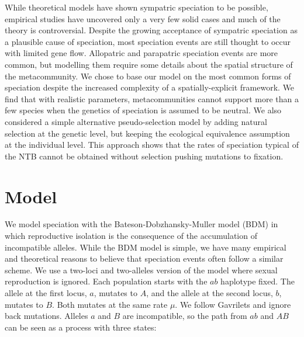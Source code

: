 \documentclass[letterpaper,twocolumn,showkeys]{revtex4-1}
\begin{document}
While theoretical models have shown sympatric speciation to be possible,
empirical studies have uncovered only a very few solid cases and much of the
theory is controversial. Despite the growing acceptance of sympatric
speciation as a plausible cause of speciation, most speciation events are
still thought to occur with limited gene flow. Allopatric and parapatric
speciation events are more common, but modelling them require some details
about the spatial structure of the metacommunity. We chose to base our model
on the most common forms of speciation despite the increased complexity of a
spatially-explicit framework. We find that with realistic parameters,
metacommunities cannot support more than a few species when the genetics of
speciation is assumed to be neutral. We also considered a simple alternative
pseudo-selection model by adding natural selection at the genetic level, but
keeping the ecological equivalence assumption at the individual level. This
approach shows that the rates of speciation typical of the NTB cannot be
obtained without selection pushing mutations to fixation.

\section{Model}

We model speciation with the Bateson-Dob\-zhan\-sky-Muller model (BDM) in
which reproductive isolation is the consequence of the accumulation of
incompatible alleles. While the BDM model is simple, we have many empirical
and theoretical reasons to believe that speciation events often follow a
similar scheme. We use a two-loci and two-alleles version of the model where
sexual reproduction is ignored. Each population starts with the $ab$ haplotype
fixed. The allele at the first locus, $a$, mutates to $A$, and the allele at
the second locus, $b$, mutates to $B$. Both mutates at the same rate $\mu$. We
follow Gavrilets and ignore back mutations. Alleles $a$ and $B$ are
incompatible, so the path from $ab$ and $AB$ can be seen as a process with
three states:
\end{document}
